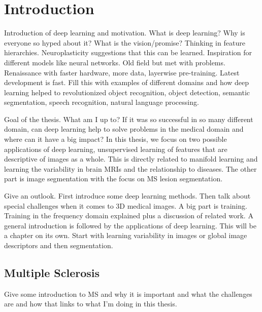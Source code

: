 \chapter{Introduction}

Introduction of deep learning and motivation. What is deep learning? Why is
everyone so hyped about it? What is the vision/promise? Thinking in feature
hierarchies. Neuroplasticity suggestions that this can be learned. Inspiration
for different models like neural networks. Old field but met with problems.
Renaissance with faster hardware, more data, layerwise pre-training. Latest
development is fast. Fill this with examples of different domains and how deep
learning helped to revolutionized object recognition, object detection, semantic
segmentation, speech recognition, natural language processing.

Goal of the thesis. What am I up to? If it was so successful in so many
different domain, can deep learning help to solve problems in the medical domain
and where can it have a big impact? In this thesis, we focus on two possible
applications of deep learning, unsupervised learning of features that are
descriptive of images as a whole. This is directly related to manifold learning
and learning the variability in brain MRIs and the relationship to diseases. The
other part is image segmentation with the focus on MS lesion segmentation.


Give an outlook. First introduce some deep learning methods. Then talk about
special challenges when it comes to 3D medical images. A big part is training.
Training in the frequency domain explained plus a discussion of related work. A
general introduction is followed by the applications of deep learning. This will
be a chapter on its own. Start with learning variability in images or global
image descriptors and then segmentation.

\section{Multiple Sclerosis}

Give some introduction to MS and why it is important and what the challenges are
and how that links to what I'm doing in this thesis.
